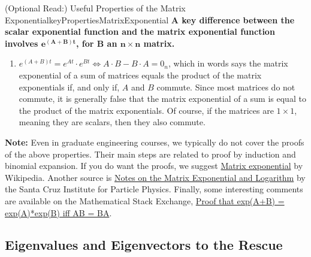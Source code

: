 \begin{propColor}{(Optional Read:) Useful Properties of the Matrix Exponential}{keyPropertiesMatrixExponential}
\textbf{A key difference between the scalar exponential function and the matrix exponential function involves $\bm{e^{(A + B)t} }$, for $\bm{B}$ an $\bm{n \times n} $ matrix.}

\begin{enumerate}
\renewcommand{\labelenumi}{(\alph{enumi})}
\setlength{\itemsep}{.2cm}
\setcounter{enumi}{4}
    \item $e^{(A + B)t} = e^{A t} \cdot e^{B t} \iff  A\cdot B - B \cdot A = 0_{n}$, which in words says the matrix exponential of a sum of matrices equals the product of the matrix exponentials if, and only if, $A$ and $B$ commute. Since most matrices do not commute, it is generally false that the matrix exponential of a sum is equal to the product of the matrix exponentials. Of course, if the matrices are $1 \times 1$, meaning they are scalars, then they also commute. \end{enumerate} 

\end{propColor}

\bigskip

\textbf{Note:} Even in graduate engineering courses, we typically do not cover the proofs of the above properties. Their main steps are related to proof by induction and binomial expansion.  If you do want the proofs, we suggest \href{https://en.wikipedia.org/wiki/Matrix_exponential}{Matrix exponential} by Wikipedia. Another source is \href{http://scipp.ucsc.edu/~haber/webpage/MatrixExpLog.pdf}{Notes on the Matrix Exponential and Logarithm} by the Santa Cruz Institute for Particle Physics. Finally, some interesting comments are available on the Mathematical Stack Exchange, \href{https://math.stackexchange.com/questions/1854759/proof-of-matrix-exponential-property-e-textbf-a-textbf-b-e-textbf-ae-t#:~:text=Proof%20of%20matrix%20exponential%20property%20eA%2BB%3DeA,if%20AB%3DBA&text=I%20know%20how%20to%20prove,)%3D0%20for%20all%20t.}{Proof that exp(A+B) = exp(A)*exp(B) iff AB = BA}.

\bigskip

\subsection{Eigenvalues and Eigenvectors to the Rescue}

